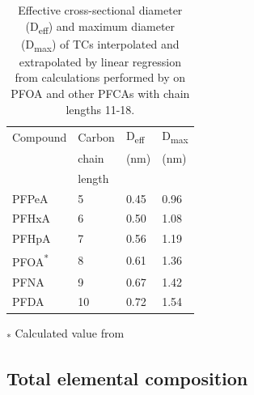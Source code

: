 \begin{table}
\caption{Effective cross-sectional diameter (D\textsubscript{eff}) and maximum diameter (D\textsubscript{max}) of TCs interpolated and extrapolated by linear regression from calculations performed by \citep{inoue2012size} on PFOA and other PFCAs with chain lengths 11-18.}
\centering
\begin{threeparttable}
\label{tab:molecsize}
\begin{tabular}{llll}
\toprule
Compound & Carbon & D\textsubscript{eff} & D\textsubscript{max} \\ 
& chain & (nm) & (nm) \\
& length & & \\ \midrule
PFPeA    & 5                                                              & 0.45                                                 & 0.96                                                 \\
PFHxA    & 6                                                              & 0.50                                                 & 1.08                                                 \\
PFHpA    & 7                                                              & 0.56                                                 & 1.19                                                 \\
PFOA\textsuperscript{*}     & 8                                                              & 0.61                                                 & 1.36                                                 \\
PFNA     & 9                                                              & 0.67                                                 & 1.42                                                 \\
PFDA     & 10                                                             & 0.72                                                 & 1.54  \\ \bottomrule                                    
\end{tabular}
\begin{tablenotes}
\item \textsubscript{*} Calculated value from \citep{inoue2012size}
\end{tablenotes}
\end{threeparttable}
\end{table}

\subsection{Total elemental composition}

